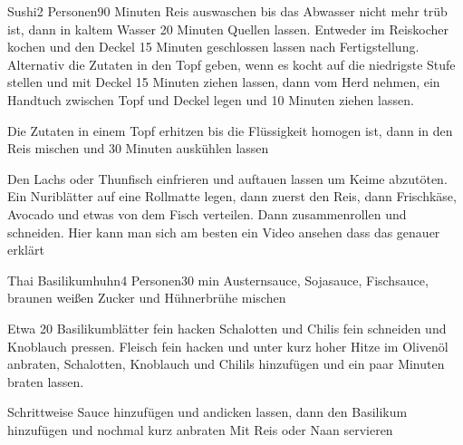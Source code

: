 \begin{recipe}{Sushi}{2 Personen}{90 Minuten}
Reis auswaschen bis das Abwasser nicht mehr trüb ist, dann in kaltem Wasser 20 Minuten Quellen lassen. Entweder im Reiskocher kochen und den Deckel 15 Minuten geschlossen lassen nach Fertigstellung. Alternativ die Zutaten in den Topf geben, wenn es kocht auf die niedrigste Stufe stellen und mit Deckel 15 Minuten ziehen lassen, dann vom Herd nehmen, ein Handtuch zwischen Topf und Deckel legen und 10 Minuten ziehen lassen.

Die Zutaten in einem Topf erhitzen bis die Flüssigkeit homogen ist, dann in den Reis mischen und 30 Minuten auskühlen lassen

Den Lachs oder Thunfisch einfrieren und auftauen lassen um Keime abzutöten. Ein Nuriblätter auf eine Rollmatte legen, dann zuerst den Reis, dann Frischkäse, Avocado und etwas von dem Fisch verteilen. Dann zusammenrollen und schneiden. Hier kann man sich am besten ein Video ansehen dass das genauer erklärt
\end{recipe}


\begin{recipe}{Thai Basilikumhuhn}{4 Personen}{30 min}
Austernsauce, Sojasauce, Fischsauce, braunen weißen Zucker und Hühnerbrühe mischen

Etwa 20 Basilikumblätter fein hacken
Schalotten und Chilis fein schneiden und Knoblauch pressen.
Fleisch fein hacken und unter kurz hoher Hitze im Olivenöl anbraten, Schalotten, Knoblauch und Chilils hinzufügen und ein paar Minuten braten lassen.

\ing[]{}{}
Schrittweise Sauce hinzufügen und andicken lassen, dann den Basilikum hinzufügen und nochmal kurz anbraten
Mit Reis oder Naan servieren
\end{recipe}


